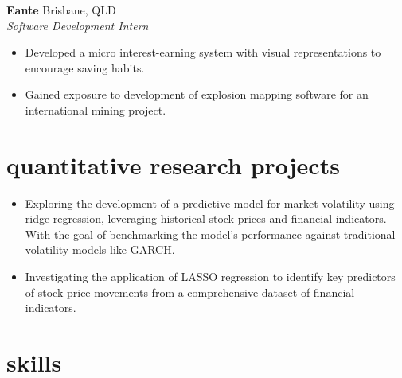 \documentclass[12pt]{article}
\begin{document}
\textbf{Eante} \hfill {Brisbane, QLD} \\
\indent \textit{\color{subtextgray}Software Development Intern}
\begin{itemize}[noitemsep, topsep=0em, left=0.8em]
  \item Developed a micro interest-earning system with visual representations to encourage saving habits.
  \item	Gained exposure to development of explosion mapping software for an international mining project.
\end{itemize}

\vspace{1em}

\section{quantitative research projects}

\begin{itemize}[noitemsep, topsep=0em, left=0.8em]
  \item Exploring the development of a predictive model for market volatility using ridge regression, leveraging historical stock prices and financial indicators. With the goal of benchmarking the model's performance against traditional volatility models like GARCH.
  \item	Investigating the application of LASSO regression to identify key predictors of stock price movements from a comprehensive dataset of financial indicators.
\end{itemize}

\vspace{1em}

\section{skills}
\end{document}

